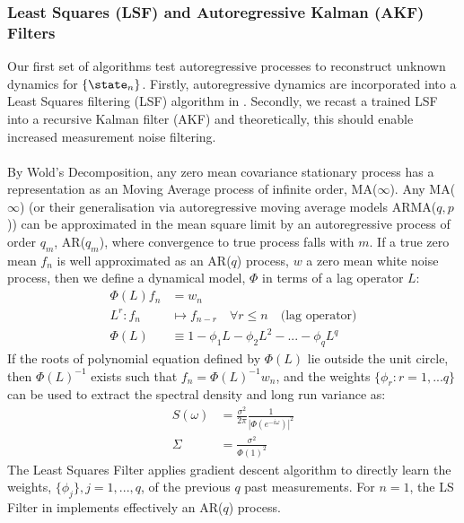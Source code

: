  

\subsubsection{Least Squares (LSF) and Autoregressive Kalman (AKF) Filters}

Our first set of algorithms test autoregressive processes to reconstruct unknown dynamics for $\{ \state_n \}$. Firstly, autoregressive dynamics are incorporated into a Least Squares filtering (LSF) algorithm in \cite{mavadia2017}. Secondly, we recast a trained LSF into a recursive Kalman filter (AKF) and theoretically, this should enable increased measurement noise filtering.
\\
\\
By Wold's Decomposition, any zero mean covariance stationary process has a representation as an Moving Average process of infinite order, MA($\infty$). Any MA($\infty$) (or their generalisation via autoregressive moving average models ARMA($q, p$)) can be approximated in the mean square limit by an autoregressive process of order $q_m$, AR($q_m$), where convergence to true process falls with $m$. If a true zero mean ${f_n}$ is well approximated as an AR($q$) process, $w$ a zero mean white noise process, then we define a dynamical model, $\Phi$ in terms of a lag operator $L$:
\begin{align}
\Phi(L) f_n & = w_n \\
L^r: f_n &\mapsto f_{n-r} \quad \forall r \leq n \quad \text{(lag operator)} \\
\Phi(L) & \equiv  1 - \phi_1 L - \phi_2 L^2 - ... - \phi_q L^q 
\end{align}
If the roots of polynomial equation defined by  $\Phi(L)$ lie outside the unit circle, then $\Phi(L)^{-1}$ exists such that $f_n = \Phi(L)^{-1} w_n$, and the weights $\{\phi_r: r = 1, ... q\}$ can be used to extract the spectral density and long run variance as:
\begin{align}
S(\omega) & = \frac{\sigma^2}{2 \pi }\frac{1}{|\Phi(e^{-i\omega})|^2} \label{eqn:sec:ap_ssp_ar_spectden}\\
\Sigma & = \frac{\sigma^2}{\Phi(1)^2}
\end{align}
The Least Squares Filter applies gradient descent algorithm to directly learn the weights, $\{\phi_j\}, j = 1, ... , q $, of the previous $q$ past measurements. For $n=1$, the LS Filter in \cite{mavadia2017} implements effectively an AR($q$) process. 

